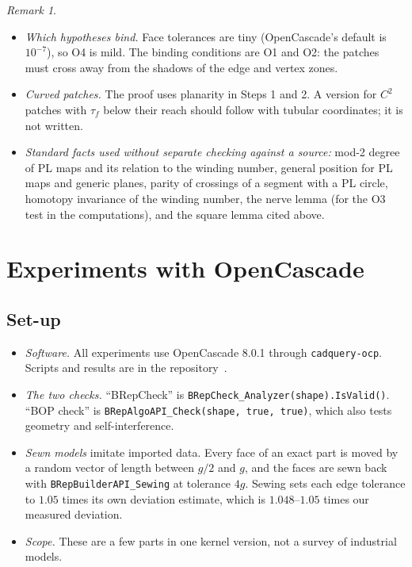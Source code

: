 \documentclass[preprint,12pt]{elsarticle}
\theoremstyle{definition}
\theoremstyle{remark}
\newtheorem{remark}[theorem]{Remark}
\begin{document}
\begin{remark}
\begin{itemize}
\item \emph{Which hypotheses bind.} Face tolerances are tiny (OpenCascade's default is $10^{-7}$), so O4 is mild.
The binding conditions are O1 and O2: the patches must cross away from the shadows of the edge and vertex zones.
\item \emph{Curved patches.} The proof uses planarity in Steps 1 and 2. A version for $C^2$ patches with $\tau_f$
below their reach should follow with tubular coordinates; it is not written.
\item \emph{Standard facts used without separate checking against a source:} mod-2 degree of PL maps and its relation
to the winding number, general position for PL maps and generic planes, parity of crossings of a segment with a PL
circle, homotopy invariance of the winding number, the nerve lemma (for the O3 test in the computations), and the
square lemma cited above.
\end{itemize}
\end{remark}

\section{Experiments with OpenCascade}\label{sec:experiments}

\subsection{Set-up}
\begin{itemize}
\item \emph{Software.} All experiments use OpenCascade 8.0.1 through \texttt{cadquery-ocp}. Scripts and results are
in the repository~\cite{repo}.
\item \emph{The two checks.} ``BRepCheck'' is \texttt{BRepCheck\_Analyzer(shape).IsValid()}. ``BOP check'' is
\texttt{BRepAlgoAPI\_Check(shape, true, true)}, which also tests geometry and self-interference.
\item \emph{Sewn models} imitate imported data. Every face of an exact part is moved by a random vector of length
between $g/2$ and $g$, and the faces are sewn back with \texttt{BRepBuilderAPI\_Sewing} at tolerance $4g$. Sewing
sets each edge tolerance to $1.05$ times its own deviation estimate, which is $1.048$--$1.05$ times our measured
deviation.
\item \emph{Scope.} These are a few parts in one kernel version, not a survey of industrial models.
\end{itemize}
\end{document}
